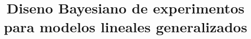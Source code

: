 \documentclass[11pt]{book}
\begin{document}



\newtheorem{theorem}{Teorema}[section] 
\newtheorem{corollary}[theorem]{Corolario}
\newtheorem{proposition}[theorem]{Proposición}
\newtheorem{lemma}[theorem]{Lema}

\theoremstyle{definition}
\newtheorem{definition}[theorem]{Definición}




\renewcommand{\listtablename}{Índice de tablas} 
\renewcommand{\tablename}{Tabla}



\title{Diseno Bayesiano de experimentos para modelos lineales generalizados} 
\end{document}
